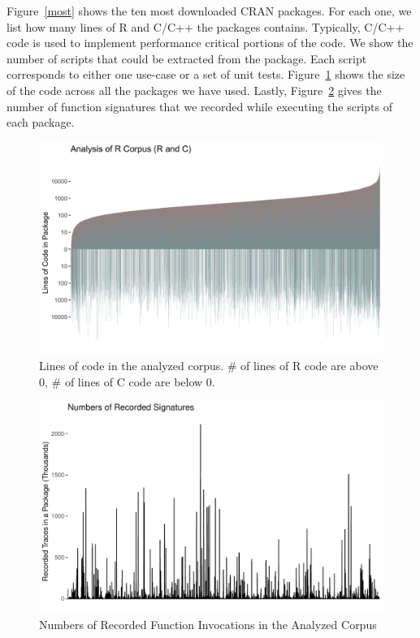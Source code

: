 \documentclass[acmsmall,10pt,review,anonymous]{acmart}\settopmatter{printfolios=true,printccs=false,printacmref=false}
\begin{document}
Figure~\ref{most} shows the ten most downloaded CRAN packages.  For each
one, we list how many lines of R and C/C++ the packages contains.
Typically, C/C++ code is used to implement performance critical portions of
the code. We show the number of scripts that could be extracted from the
package. Each script corresponds to either one use-case or a set of unit
tests.  Figure~\ref{allcloc} shows the size of the code across all the
packages we have used.  Lastly, Figure~\ref{recorded} gives the number of
function signatures that we recorded while executing the scripts of each
package.

\begin{figure}[htbp]
\begin{center}
\includegraphics[scale=0.15]{linesofrandccode.jpg}
\caption{Lines of code in the analyzed corpus. \# of lines of R code are above 0, \# of lines of C code are below 0.}
\label{allcloc}
\end{center}
\end{figure}

\begin{figure}[htbp]
\begin{center}
\includegraphics[scale=0.15]{recordsbypkg}
\caption{Numbers of Recorded Function Invocations in the Analyzed Corpus}
\label{recorded}
\end{center}
\end{figure}
\end{document}
